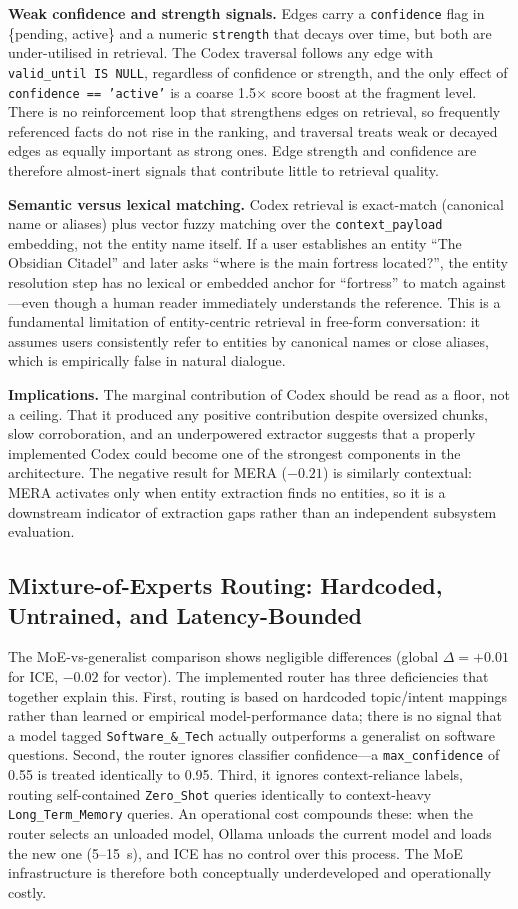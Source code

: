 \documentclass[10pt]{article}
\begin{document}
\textbf{Weak confidence and strength signals.} Edges carry a \texttt{confidence}
flag in \{pending, active\} and a numeric \texttt{strength} that decays over time,
but both are under-utilised in retrieval. The Codex traversal follows any edge
with \texttt{valid\_until IS NULL}, regardless of confidence or strength, and the
only effect of \texttt{confidence == 'active'} is a coarse 1.5$\times$ score
boost at the fragment level. There is no reinforcement loop that strengthens
edges on retrieval, so frequently referenced facts do not rise in the ranking,
and traversal treats weak or decayed edges as equally important as strong ones.
Edge strength and confidence are therefore almost-inert signals that contribute
little to retrieval quality.

\textbf{Semantic versus lexical matching.} Codex retrieval is exact-match (canonical name or aliases) plus vector fuzzy matching over the \texttt{context\_payload} embedding, not the entity name itself. If a user establishes an entity ``The Obsidian Citadel'' and later asks ``where is the main fortress located?'', the entity resolution step has no lexical or embedded anchor for ``fortress'' to match against---even though a human reader immediately understands the reference. This is a fundamental limitation of entity-centric retrieval in free-form conversation: it assumes users consistently refer to entities by canonical names or close aliases, which is empirically false in natural dialogue.

\textbf{Implications.} The marginal contribution of Codex should be read as a floor, not a ceiling. That it produced any positive contribution despite oversized chunks, slow corroboration, and an underpowered extractor suggests that a properly implemented Codex could become one of the strongest components in the architecture. The negative result for MERA ($-0.21$) is similarly contextual: MERA activates only when entity extraction finds no entities, so it is a downstream indicator of extraction gaps rather than an independent subsystem evaluation.

\subsection{Mixture-of-Experts Routing: Hardcoded, Untrained, and Latency-Bounded}
The MoE-vs-generalist comparison shows negligible differences (global $\Delta = +0.01$ for ICE, $-0.02$ for vector). The implemented router has three deficiencies that together explain this. First, routing is based on hardcoded topic/intent mappings rather than learned or empirical model-performance data; there is no signal that a model tagged \texttt{Software\_\&\_Tech} actually outperforms a generalist on software questions. Second, the router ignores classifier confidence---a \texttt{max\_confidence} of 0.55 is treated identically to 0.95. Third, it ignores context-reliance labels, routing self-contained \texttt{Zero\_Shot} queries identically to context-heavy \texttt{Long\_Term\_Memory} queries. An operational cost compounds these: when the router selects an unloaded model, Ollama unloads the current model and loads the new one (5--15~s), and ICE has no control over this process. The MoE infrastructure is therefore both conceptually underdeveloped and operationally costly.
\end{document}
